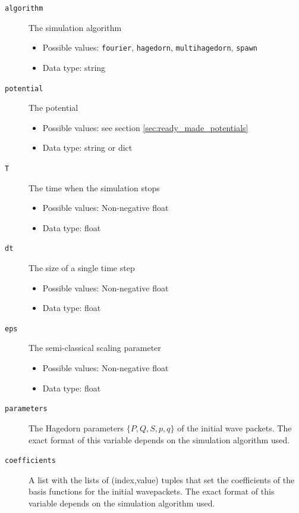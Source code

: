 \documentclass[a4paper,10pt]{report}
\begin{document}
\begin{description}
  \item[\texttt{algorithm}] The simulation algorithm
  \begin{itemize}
    \item Possible values: \texttt{fourier}, \texttt{hagedorn}, \texttt{multihagedorn}, \texttt{spawn}
    \item Data type: string
  \end{itemize}

  \item[\texttt{potential}] The potential
  \begin{itemize}
    \item Possible values: see section \ref{sec:ready_made_potentials}
    \item Data type: string or dict
  \end{itemize}

  \item[\texttt{T}] The time when the simulation stops
  \begin{itemize}
    \item Possible values: Non-negative float
    \item Data type: float
  \end{itemize}

  \item[\texttt{dt}] The size of a single time step
  \begin{itemize}
    \item Possible values: Non-negative float
    \item Data type: float
  \end{itemize}

  \item[\texttt{eps}] The semi-classical scaling parameter
  \begin{itemize}
    \item Possible values: Non-negative float
    \item Data type: float
  \end{itemize}

  \item[\texttt{parameters}] The Hagedorn parameters $\{P, Q, S, p, q \}$ of the
    initial wave packets. The exact format of this variable depends on the
    simulation algorithm used.

  \item[\texttt{coefficients}] A list with the lists of (index,value) tuples that
    set the coefficients of the basis functions for the initial wavepackets. The
    exact format of this variable depends on the simulation algorithm used.


\end{description}
\end{document}
